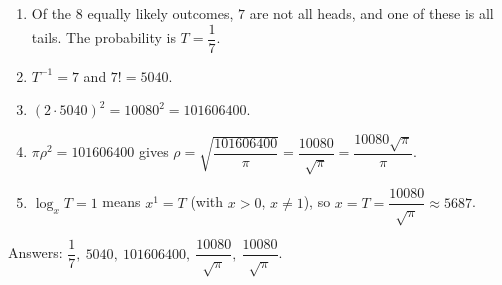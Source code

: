 \begin{enumerate}
\item Of the $8$ equally likely outcomes, $7$ are not all heads, and one of these is all tails. The probability is $T=\dfrac{1}{7}$.
\item $T^{-1}=7$ and $7!=5040$.
\item $(2\cdot5040)^2=10080^2=101606400$.
\item $\pi\rho^2=101606400$ gives $\rho=\sqrt{\dfrac{101606400}{\pi}}=\dfrac{10080}{\sqrt{\pi}}=\dfrac{10080\sqrt{\pi}}{\pi}$.
\item $\log_xT=1$ means $x^1=T$ (with $x>0$, $x\ne1$), so $x=T=\boxed{\dfrac{10080}{\sqrt{\pi}}}\approx5687$.
\end{enumerate}
Answers: $\dfrac{1}{7},\ 5040,\ 101606400,\ \dfrac{10080}{\sqrt{\pi}},\ \dfrac{10080}{\sqrt{\pi}}$.
